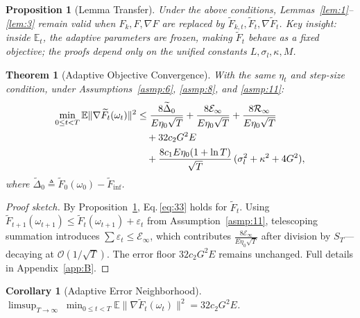 \documentclass[journal]{IEEEtran}
\newtheorem{theorem}{Theorem}
\newtheorem{corollary}{Corollary}
\newtheorem{proposition}{Proposition}
\begin{document}
\begin{proposition}[Lemma Transfer]\label{prop:7}
  Under the above conditions, Lemmas~\ref{lem:1}--\ref{lem:3} remain valid when
  \(F_k, F, \nabla F\) are replaced by \(\widetilde F_{k,t}, \widetilde F_t, \nabla\widetilde F_t\).
  Key insight: inside \(\mathbb E_t\), the adaptive parameters are frozen, making \(\widetilde F_t\) behave as a fixed objective;
  the proofs depend only on the unified constants \(L, \sigma_l, \kappa, M\).
\end{proposition}

\begin{theorem}[Adaptive Objective Convergence]\label{thm:2}
  With the same \(\eta_t\) and step-size condition, under
  Assumptions~\ref{asmp:6}, \ref{asmp:8}, and \ref{asmp:11}:
  \begin{align}
    \min_{0 \le t < T} \mathbb E\|\nabla\widetilde F_t(\omega_t)\|^2
    &\le \frac{8\widetilde\Delta_0}{E\eta_0\sqrt{T}}
       + \frac{8\mathcal E_\infty}{E\eta_0\sqrt{T}}
       + \frac{8\mathcal R_\infty}{E\eta_0\sqrt{T}} \notag\\
    &\quad + 32 c_2 G^2 E \notag\\
    &\quad + \frac{8c_1 E\eta_0(1 + \ln T)}{\sqrt{T}}\,
          (\sigma_l^2 + \kappa^2 + 4G^2),
    \label{eq:42}
  \end{align}
  where \(\widetilde\Delta_0 \triangleq \widetilde F_0(\omega_0) - \widetilde F_{\inf}\).
\end{theorem}

\begin{proof}[Proof sketch]
  By Proposition~\ref{prop:7}, Eq.\,\eqref{eq:33} holds for \(\widetilde F_t\).
  Using \(\widetilde F_{t+1}(\omega_{t+1}) \le \widetilde F_t(\omega_{t+1}) + \varepsilon_t\) from Assumption~\ref{asmp:11},
  telescoping summation introduces \(\sum\varepsilon_t \le \mathcal E_\infty\),
  which contributes \(\frac{8\mathcal E_\infty}{E\eta_0\sqrt{T}}\) after division by \(S_T\)---decaying at \(\mathcal O(1/\sqrt{T})\).
  The error floor \(32 c_2 G^2 E\) remains unchanged.
  Full details in Appendix~\ref{app:B}.
\end{proof}

\begin{corollary}[Adaptive Error Neighborhood]\label{cor:2}
  \(\displaystyle \limsup_{T\to\infty}\;\min_{0\le t<T} \mathbb E\|\nabla\widetilde F_t(\omega_t)\|^2 = 32 c_2 G^2 E\).
\end{corollary}

\end{document}
